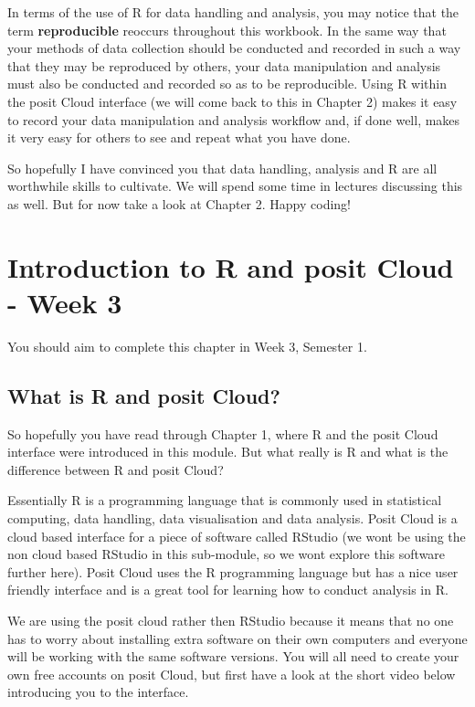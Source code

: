 \documentclass[
]{book}
\begin{document}
In terms of the use of R for data handling and analysis, you may notice that the term \textbf{reproducible} reoccurs throughout this workbook. In the same way that your methods of data collection should be conducted and recorded in such a way that they may be reproduced by others, your data manipulation and analysis must also be conducted and recorded so as to be reproducible. Using R within the posit Cloud interface (we will come back to this in Chapter 2) makes it easy to record your data manipulation and analysis workflow and, if done well, makes it very easy for others to see and repeat what you have done.

So hopefully I have convinced you that data handling, analysis and R are all worthwhile skills to cultivate. We will spend some time in lectures discussing this as well. But for now take a look at Chapter 2. Happy coding!

\chapter{Introduction to R and posit Cloud - Week 3}\label{introduction-to-r-and-posit-cloud---week-3}

You should aim to complete this chapter in Week 3, Semester 1.

\section{What is R and posit Cloud?}\label{what-is-r-and-posit-cloud}

So hopefully you have read through Chapter 1, where R and the posit Cloud interface were introduced in this module. But what really is R and what is the difference between R and posit Cloud?

Essentially R is a programming language that is commonly used in statistical computing, data handling, data visualisation and data analysis. Posit Cloud is a cloud based interface for a piece of software called RStudio (we wont be using the non cloud based RStudio in this sub-module, so we wont explore this software further here). Posit Cloud uses the R programming language but has a nice user friendly interface and is a great tool for learning how to conduct analysis in R.

We are using the posit cloud rather then RStudio because it means that no one has to worry about installing extra software on their own computers and everyone will be working with the same software versions. You will all need to create your own free accounts on posit Cloud, but first have a look at the short video below introducing you to the interface.
\end{document}
